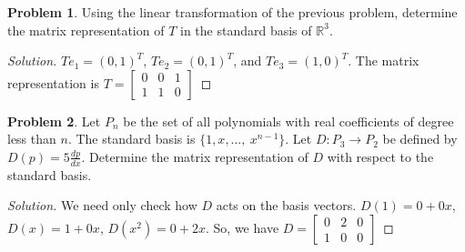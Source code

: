 \documentclass[oneside]{book}
\theoremstyle{definition}
\newtheorem{problem}{Problem}[section]
\begin{document}
\begin{problem}
Using the linear transformation of the previous problem, determine the matrix representation of $T$ in the standard basis of $\mathbb{R}^3$.
\end{problem}
\begin{proof}[Solution]
$Te_1 = (0,1)^T$, $T e_2 = (0,1)^T$, and $Te_3 = (1,0)^T$. The matrix representation is $T=\begin{bmatrix} 0 & 0 & 1 \\ 1 & 1 & 0 \end{bmatrix}$
\end{proof}

\begin{problem}
Let $P_n$ be the set of all polynomials with real coefficients of degree less than $n$. The standard basis is $\{1,x,\hdots, \ x^{n-1}\}$. Let $D:P_3 \rightarrow P_2$ be defined by $D(p) = 5\frac{dp}{dx}$. Determine the matrix representation of $D$ with respect to the standard basis.
\end{problem}
\begin{proof}[Solution]
We need only check how $D$ acts on the basis vectors. $D(1) = 0+0x$, $D(x) = 1+0x$, $D(x^2) = 0+2x$. So, we have $D = \begin{bmatrix} 0 & 2 & 0 \\ 1 & 0 & 0 \end{bmatrix}$
\end{proof}
\end{document}
